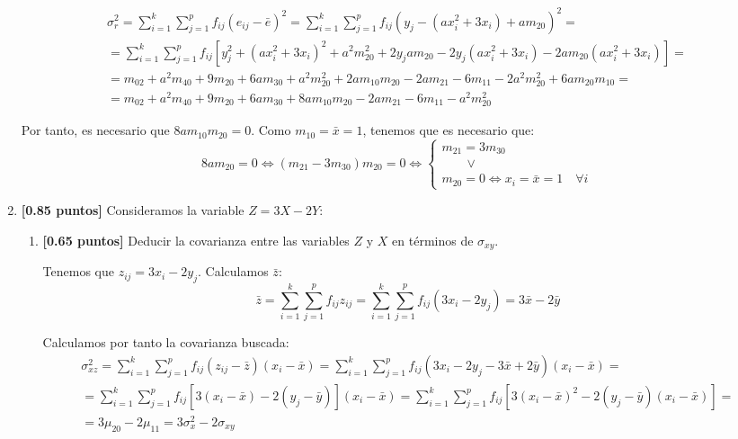 \documentclass[12pt]{article}
\begin{document}
\begin{ejercicio}
\begin{enumerate}
    \begin{multline*}
        \sigma^2_r = \sum_{i=1}^k \sum_{j=1}^p f_{ij}(e_{ij} - \bar{e})^2
        =\sum_{i=1}^k \sum_{j=1}^p f_{ij}(y_j -(ax_i^2+3x_i) +am_{20})^2
        =\\= \sum_{i=1}^k \sum_{j=1}^p f_{ij}[y_j^2 + (ax_i^2+3x_i)^2 +a^2m_{20}^2+2y_jam_{20} -2y_j(ax_i^2+3x_i) -2am_{20}(ax_i^2+3x_i)]
        =\\= m_{02} +a^2m_{40} + 9m_{20} + 6am_{30} + a^2m_{20}^2 +2am_{10}m_{20} -2am_{21} -6m_{11} -2a^2m_{20}^2 +6am_{20}m_{10}
        =\\= m_{02} +a^2m_{40} + 9m_{20} + 6am_{30} +8am_{10}m_{20} -2am_{21} -6m_{11} -a^2m_{20}^2
    \end{multline*}

    Por tanto, es necesario que $8am_{10}m_{20}=0$. Como $m_{10}=\bar{x}=1$, tenemos que es necesario que:
    $$8am_{20}=0 \Longleftrightarrow (m_{21}-3m_{30})m_{20}=0
    \Longleftrightarrow \left\{\begin{array}{l}
        m_{21}=3m_{30}  \\
        \qquad \lor \\
        m_{20}=0 \Longleftrightarrow x_i=\bar{x}=1 \quad \forall i
    \end{array}\right.
    $$

    \item \textbf{[0.85 puntos]} Consideramos la variable $Z=3X-2Y$:
    \begin{enumerate}
        \item \textbf{[0.65 puntos]} Deducir la covarianza entre las variables $Z$ y $X$ en términos de $\sigma_{xy}$.

        Tenemos que $z_{ij}=3x_i-2y_j$. Calculamos $\bar{z}$:
        \begin{equation*}
            \bar{z}=\sum_{i=1}^k\sum_{j=1}^pf_{ij}z_{ij}
            = \sum_{i=1}^k\sum_{j=1}^pf_{ij}(3x_i-2y_j) = 3\bar{x} - 2\bar{y}
        \end{equation*}

        Calculamos por tanto la covarianza buscada:
        \begin{multline*}
            \sigma^2_{xz}
            =\sum_{i=1}^k\sum_{j=1}^pf_{ij}(z_{ij}-\bar{z})(x_i-\bar{x})
            =\sum_{i=1}^k\sum_{j=1}^pf_{ij}(3x_i-2y_j -3\bar{x}+2\bar{y})(x_i-\bar{x})
            =\\= \sum_{i=1}^k\sum_{j=1}^pf_{ij}[3(x_i-\bar{x})-2(y_j-\bar{y})](x_i-\bar{x})
            = \sum_{i=1}^k\sum_{j=1}^p f_{ij}[3(x_i-\bar{x})^2-2(y_j-\bar{y})(x_i-\bar{x})]
            =\\= 3\mu_{20} -2\mu_{11} = 3\sigma_x^2 -2\sigma_{xy}
        \end{multline*}


\end{enumerate}
\end{enumerate}
\end{ejercicio}
\end{document}
